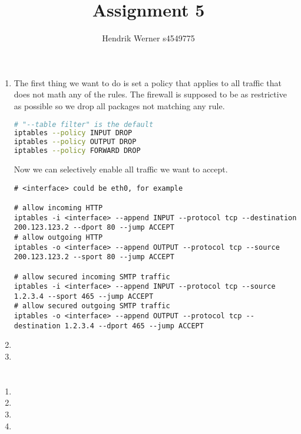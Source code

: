 \documentclass[12pt, a4paper]{article}
\title{Assignment 5}
\author{Hendrik Werner s4549775}
\begin{document}
\maketitle

\section{} %
\begin{enumerate}[a]
	\item %
	The first thing we want to do is set a policy that applies to all traffic that does not math any of the rules. The firewall is supposed to be as restrictive as possible so we drop all packages not matching any rule.

	\begin{lstlisting}[language=bash]
# "--table filter" is the default
iptables --policy INPUT DROP
iptables --policy OUTPUT DROP
iptables --policy FORWARD DROP
	\end{lstlisting}

	Now we can selectively enable all traffic we want to accept.

	\begin{lstlisting}
# <interface> could be eth0, for example

# allow incoming HTTP
iptables -i <interface> --append INPUT --protocol tcp --destination 200.123.123.2 --dport 80 --jump ACCEPT
# allow outgoing HTTP
iptables -o <interface> --append OUTPUT --protocol tcp --source 200.123.123.2 --sport 80 --jump ACCEPT

# allow secured incoming SMTP traffic
iptables -i <interface> --append INPUT --protocol tcp --source 1.2.3.4 --sport 465 --jump ACCEPT
# allow secured outgoing SMTP traffic
iptables -o <interface> --append OUTPUT --protocol tcp --destination 1.2.3.4 --dport 465 --jump ACCEPT
	\end{lstlisting}
	\item %
	\item %
\end{enumerate}

\section{} %

\section{} %
\begin{enumerate}[a]
	\item %
	\item %
	\item %
	\item %
\end{enumerate}
\end{document}
